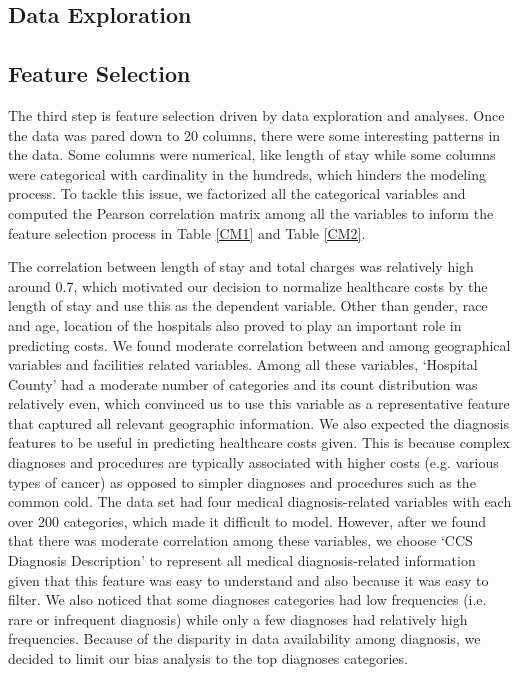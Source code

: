 \documentclass[10pt,twocolumn,letterpaper]{article}
\begin{document}
\subsection{Data Exploration}







\subsection{Feature Selection}
The third step is feature selection driven by data exploration and analyses. Once the data was pared down to 20 columns, there were some interesting patterns in the data. Some columns were numerical, like length of stay while some columns were categorical with cardinality in the hundreds, which hinders the modeling process. To tackle this issue, we factorized all the categorical variables  and computed the Pearson correlation matrix among all the variables to inform the feature selection process in Table \ref{CM1} and Table \ref{CM2}.

The correlation between length of stay and total charges was relatively high around 0.7, which motivated our decision to normalize healthcare costs by the length of stay and use this as the dependent variable. 
Other than gender, race and age, location of the hospitals also proved to play an important role in predicting costs. We found moderate correlation between and among geographical variables and facilities related variables. Among all these variables, `Hospital County' had a moderate number of categories and its count distribution was relatively even, which convinced us to use this variable as a representative feature that captured all relevant geographic information.
We also expected the diagnosis features to be useful in predicting healthcare costs given. This is because complex diagnoses and procedures are typically associated with higher costs (e.g. various types of cancer) as opposed to simpler diagnoses and procedures such as the common cold. The data set had four medical diagnosis-related variables with each over 200 categories, which made it difficult to model. However, after we found that there was moderate correlation among these variables, we choose `CCS Diagnosis Description' to represent all medical diagnosis-related information given that this feature was easy to understand and also because it was easy to filter. We also noticed that some diagnoses categories had low frequencies (i.e. rare or infrequent diagnosis) while only a few diagnoses had relatively high frequencies. Because of the disparity in data availability among diagnosis, we decided to limit our bias analysis to the top diagnoses categories.
\end{document}
